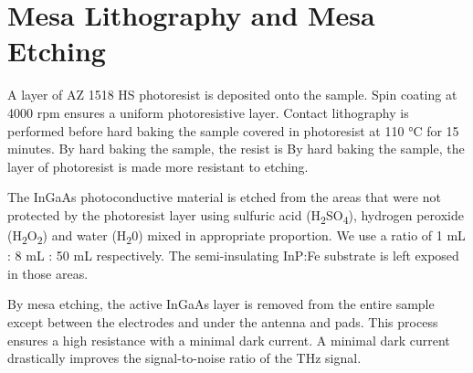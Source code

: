 \section{Mesa Lithography and Mesa Etching}

A layer of AZ 1518 HS photoresist is deposited onto the sample. Spin coating at 4000 rpm ensures a uniform photoresistive layer. Contact lithography is performed before hard baking the sample covered in photoresist at \num{110} \si{\celsius} for \num{15} minutes. By hard baking the sample, the resist is 
By hard baking the sample, the layer of photoresist is made more resistant to etching.   

The InGaAs photoconductive material is etched from the areas that were not protected by the photoresist layer using 
sulfuric acid (H\textsubscript{2}SO\textsubscript{4}), hydrogen peroxide (H\textsubscript{2}O\textsubscript{2}) and water (H\textsubscript{2}0) mixed in appropriate proportion. We use a ratio of \num{1} \si{\milli \liter} : \num{8} \si{\milli \liter} : \num{50} \si{\milli \liter} respectively. The semi-insulating InP:Fe substrate is left exposed in those areas. 

By mesa etching, the active InGaAs layer is removed from the entire sample except between the electrodes and under the antenna and pads. This process ensures a high resistance with a minimal dark current. A minimal dark current drastically improves the signal-to-noise ratio of the THz signal. 

